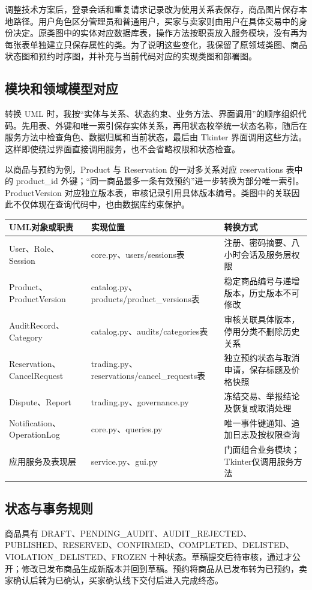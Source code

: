 \documentclass[11pt,a4paper]{ctexart}
\begin{document}
调整技术方案后，登录会话和重复请求记录改为使用关系表保存，商品图片保存本地路径。用户角色区分管理员和普通用户，买家与卖家则由用户在具体交易中的身份决定。原类图中的实体对应数据库表，操作方法按职责放入服务模块，没有再为每张表单独建立只保存属性的类。为了说明这些变化，我保留了原领域类图、商品状态图和预约时序图，并补充与当前代码对应的实现类图和部署图。

\subsection{模块和领域模型对应}
转换 UML 时，我按“实体与关系、状态约束、业务方法、界面调用”的顺序组织代码。先用表、外键和唯一索引保存实体关系，再用状态枚举统一状态名称，随后在服务方法中检查角色、数据归属和当前状态，最后由 Tkinter 界面调用这些方法。这样即使绕过界面直接调用服务，也不会省略权限和状态检查。

以商品与预约为例，Product 与 Reservation 的一对多关系对应 reservations 表中的 product\_id 外键；“同一商品最多一条有效预约”进一步转换为部分唯一索引。ProductVersion 对应独立版本表，审核记录引用具体版本编号。类图中的关联因此不仅体现在查询代码中，也由数据库约束保护。

\begin{tabularx}{\textwidth}{p{}Y Y}
\toprule
UML对象或职责 & 实现位置 & 转换方式\\
\midrule
User、Role、Session & core.py、users/sessions表 & 注册、密码摘要、八小时会话及服务层权限\\
Product、ProductVersion & catalog.py、products/product\_versions表 & 稳定商品编号与递增版本，历史版本不可修改\\
AuditRecord、Category & catalog.py、audits/categories表 & 审核关联具体版本，停用分类不删除历史关系\\
Reservation、CancelRequest & trading.py、reservations/cancel\_requests表 & 独立预约状态与取消申请，保存标题及价格快照\\
Dispute、Report & trading.py、governance.py & 冻结交易、举报结论及恢复或取消处理\\
Notification、OperationLog & core.py、queries.py & 唯一事件键通知、追加日志及按权限查询\\
应用服务及表现层 & service.py、gui.py & 门面组合业务模块；Tkinter仅调用服务方法\\
\bottomrule
\end{tabularx}

\subsection{状态与事务规则}
商品具有 DRAFT、PENDING\_AUDIT、AUDIT\_REJECTED、PUBLISHED、RESERVED、CONFIRMED、COMPLETED、DELISTED、VIOLATION\_DELISTED、FROZEN 十种状态。草稿提交后待审核，通过才公开；修改已发布商品生成新版本并回到草稿。预约将商品从已发布转为已预约，卖家确认后转为已确认，买家确认线下交付后进入完成终态。
\end{document}
